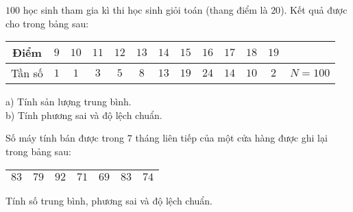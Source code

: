 \begin{vd}%
	$100$ học sinh tham gia kì thi học sinh giỏi toán (thang điểm là $20$). Kết quả được cho trong bảng sau:
	\begin{center}
		\begin{tabular}{|c|c|c|c|c|c|c|c|c|c|c|c|c|}
			\hline 
			Điểm & $9$ & $10$ & $11$ & $12$ & $13$ & $14$ & $15$ & $16$ & $17$ & $18$ & $19$& \\ 
			\hline 
			Tần số & $1$ & $1$ & $3$ & $5$ & $8$ & $13$ & $19$ & $24$ & $14$ & $10$ & $2$ & $N=100$\\ 
			\hline 
		\end{tabular} 
	\end{center}
	a) Tính sản lượng trung bình.\\
	b) Tính phương sai và độ lệch chuẩn.
\end{vd}

\begin{vd}%
	Số máy tính bán được trong $7$ tháng liên tiếp của một cửa hàng được ghi lại trong bảng sau:
	\begin{center}
		\begin{tabular}{|c|c|c|c|c|c|c|}
			\hline 
			$83$ & $79$ & $92$ & $71$ & $69$ & $83$ & $74$ \\ 
			\hline 
		\end{tabular} 
	\end{center}
	Tính số trung bình, phương sai và độ lệch chuẩn.
\end{vd}




